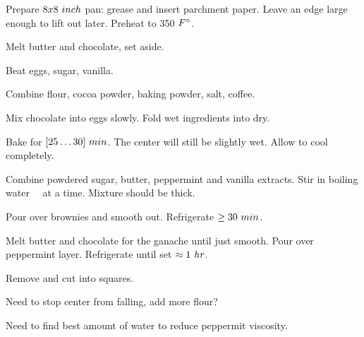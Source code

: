\begin{preparation}
\item Prepare $8x8~\inch$ pan: grease and insert parchment paper.
	Leave an edge large enough to lift out later.
	Preheat to 350 $\Fahrenheit$.

\item Melt butter and chocolate, set aside.

\item Beat eggs, sugar, vanilla.

\item Combine flour, cocoa powder, baking powder, salt, coffee.

\item Mix chocolate into eggs slowly.
	Fold wet ingredients into dry.

\item Bake for $[25 \ldots 30]~\minute$.
	The center will still be slightly wet.
	Allow to cool completely.

\item Combine powdered sugar, butter, peppermint and vanilla extracts.
	Stir in boiling water \onehalf~\teaspoon~at a time.
	Mixture should be thick.

\item Pour over brownies and smooth out.
	Refrigerate $\ge 30~\minute$.

\item Melt butter and chocolate for the ganache until just smooth.
	Pour over peppermint layer.
	Refrigerate until set $\approx 1~\hour$.

\item Remove and cut into squares.
\end{preparation}


\begin{experiments}
\item Need to stop center from falling, add more flour?
\item Need to find best amount of water to reduce peppermit viscosity.
\end{experiments}


\recipeend
